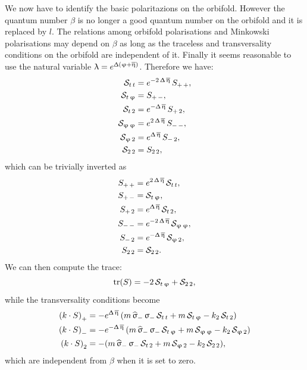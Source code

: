 We now have to identify the basic polaritazions on the orbifold.
However the quantum number $\beta$ is no longer a good quantum number on the orbifold and it is replaced by $l$.
The relations among orbifold polarisations and Minkowski polarisations may depend on $\beta$ as long as the traceless and transversality conditions on the orbifold are independent of it.\footnotemark{}
Finally it seems reasonable to use the natural variable $\uplambda = e^{\Updelta \qty( \upvarphi + \overline{\upeta} )}$.
Therefore we have:
\begin{equation}
  \begin{split}
    \mathcal{S}_{t\,t} & = e^ {- 2\,\Updelta\,\overline{\upeta} }\,S_{+\,+},
    \\
    \mathcal{S}_{t\,\upvarphi} & = S_{+\,-},
    \\
    \mathcal{S}_{t\,2} & = e^ {- \Updelta\,\overline{\upeta} }\,S_{+\,2},
    \\
    \mathcal{S}_{\upvarphi\,\upvarphi} & = e^{2\,\Updelta\,\overline{\upeta}}\,S_{-\,-},
    \\
    \mathcal{S}_{\upvarphi\,2} & = e^{\Updelta\,\overline{\upeta}}\,S_{-\,2},
    \\
    \mathcal{S}_{2\,2} & = S_{2\,2},
  \end{split}
\end{equation}
which can be trivially inverted as
\begin{equation}
  \begin{split}
    S_{+\,+} & = e^{2\,\Updelta\,\overline{\upeta}}\,\mathcal{S}_{t\,t},
    \\
    S_{+\,-} & = \mathcal{S}_{t\,\upvarphi},
    \\
    S_{+\,2} & = e^{\Updelta\,\overline{\upeta}}\,\mathcal{S}_{t\,2},
    \\
    S_{-\,-} & = e^ {- 2\,\Updelta\,\overline{\upeta} }\,\mathcal{S}_{\upvarphi\,\upvarphi},
    \\
    S_{-\,2} & = e^ {- \Updelta\,\overline{\upeta} }\,\mathcal{S}_{\upvarphi\,2},
    \\
    S_{2\,2} & = \mathcal{S}_{2\,2}.
  \end{split}
\end{equation}
We can then compute the trace:
\begin{equation}
  \tr(S) = -2\, \mathcal{S}_{t\,\upvarphi} + \mathcal{S}_{2\,2},
\end{equation}
while the transversality conditions become
\begin{equation}
  \begin{split}
    \qty(k \cdot S)_+
    & =
    -
    e^{\Delta\, \beta}\,
    \qty(%
      m\, \hsigma_-\, \sigma_-\, \cS_{t\,t}
      +
      m\, \cS_{t\,\varphi}
      -
      k_{2}\, \cS_{t\,2}
    )
    \\
    \qty(k \cdot S)_-
    & =
    -
    e^{-\Delta\, \beta}\,
    \qty(%
      m\, \hsigma_-\, \sigma_-\, \cS_{t\,\varphi}
      +
      m\, \cS_{\varphi\,\varphi}
      -
      k_{2}\, \cS_{\varphi\,2}
    )
    \\
    \qty(k \cdot S)_2
    & =
    -
    \qty(%
      m\, \hsigma_-\, \sigma_-\, \cS_{t\,2}
      +
      m\, \cS_{\varphi\,2}
      -
      k_{2}\, \cS_{2\,2}
    ),
  \end{split}
\end{equation}
which are independent from $\beta$ when it is set to zero.


